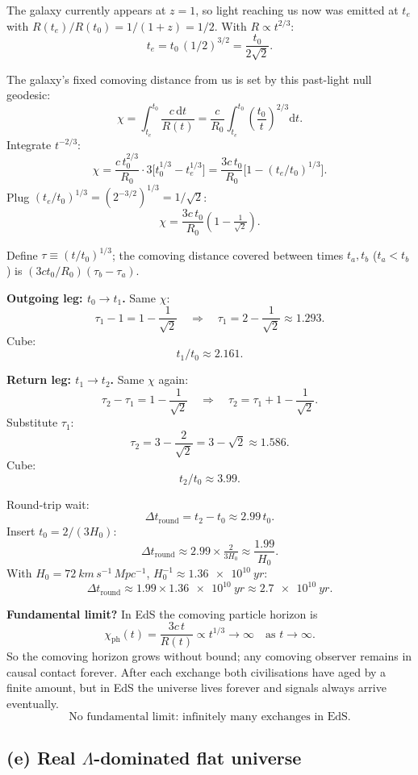 \documentclass[11pt]{article}
\newcommand{\de}{\mathrm{d}}
\begin{document}
The galaxy currently appears at $z=1$, so light reaching us now was emitted at $t_e$ with $R(t_e)/R(t_0) = 1/(1+z) = 1/2$. With $R\propto t^{2/3}$:
\[
t_e = t_0\,(1/2)^{3/2} = \frac{t_0}{2\sqrt{2}}.
\]

The galaxy's fixed comoving distance from us is set by this past-light null geodesic:
\[
\chi = \int_{t_e}^{t_0}\frac{c\,\de t}{R(t)} = \frac{c}{R_0}\int_{t_e}^{t_0}\!\left(\frac{t_0}{t}\right)^{2/3}\!\de t.
\]
Integrate $t^{-2/3}$:
\[
\chi = \frac{c\, t_0^{2/3}}{R_0}\cdot 3\bigl[t_0^{1/3} - t_e^{1/3}\bigr] = \frac{3 c\, t_0}{R_0}\bigl[1 - (t_e/t_0)^{1/3}\bigr].
\]
Plug $(t_e/t_0)^{1/3} = (2^{-3/2})^{1/3} = 1/\sqrt 2$:
\[
\chi = \frac{3 c\, t_0}{R_0}\left(1 - \tfrac{1}{\sqrt 2}\right).
\]

Define $\tau\equiv(t/t_0)^{1/3}$; the comoving distance covered between times $t_a, t_b$ ($t_a<t_b$) is $(3ct_0/R_0)(\tau_b - \tau_a)$.

\textbf{Outgoing leg: $t_0 \to t_1$.} Same $\chi$:
\[
\tau_1 - 1 = 1 - \frac{1}{\sqrt 2}\quad\Longrightarrow\quad \tau_1 = 2 - \frac{1}{\sqrt 2}\approx 1.293.
\]
Cube:
\[
t_1/t_0 \approx 2.161.
\]

\textbf{Return leg: $t_1 \to t_2$.} Same $\chi$ again:
\[
\tau_2 - \tau_1 = 1 - \frac{1}{\sqrt 2}\quad\Longrightarrow\quad \tau_2 = \tau_1 + 1 - \frac{1}{\sqrt 2}.
\]
Substitute $\tau_1$:
\[
\tau_2 = 3 - \frac{2}{\sqrt 2} = 3 - \sqrt 2\approx 1.586.
\]
Cube:
\[
t_2/t_0 \approx 3.99.
\]

Round-trip wait:
\[
\Delta t_{\text{round}} = t_2 - t_0 \approx 2.99\,t_0.
\]
Insert $t_0 = 2/(3H_0)$:
\[
\boxed{\;\Delta t_{\text{round}} \approx 2.99 \times \tfrac{2}{3 H_0} \approx \frac{1.99}{H_0}.\;}
\]
With $H_0 = \SI{72}{km\,s^{-1}\,Mpc^{-1}}$, $H_0^{-1} \approx \SI{1.36e10}{yr}$:
\[
\Delta t_{\text{round}} \approx 1.99 \times \SI{1.36e10}{yr} \approx \SI{2.7e10}{yr}.
\]

\textbf{Fundamental limit?} In EdS the comoving particle horizon is
\[
\chi_{\text{ph}}(t) = \frac{3 c\, t}{R(t)}\propto t^{1/3}\to\infty\quad\text{as }t\to\infty.
\]
So the comoving horizon grows without bound; any comoving observer remains in causal contact forever. After each exchange both civilisations have aged by a finite amount, but in EdS the universe lives forever and signals always arrive eventually.
\[
\boxed{\;\text{No fundamental limit: infinitely many exchanges in EdS.}\;}
\]

\subsection*{(e) Real $\Lambda$-dominated flat universe}
\end{document}

